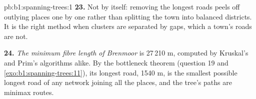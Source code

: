 \begin{solution}{pb:b1:spanning-trees:1}
\textbf{23.} Not by itself: removing the longest roads peels off outlying places one by one rather than splitting the
town into balanced districts. It is the right method when clusters are separated by gaps, which a town's roads are not.

\textbf{24.} \emph{The minimum fibre length of Brenmoor} is 27\,210 m, computed by Kruskal's and Prim's algorithms alike.
By the bottleneck theorem (question 19 and \cref{exo:b1:spanning-trees:11}), its longest road, 1540 m, is the smallest
possible longest road of any network joining all the places, and the tree's paths are minimax routes.
\end{solution}
